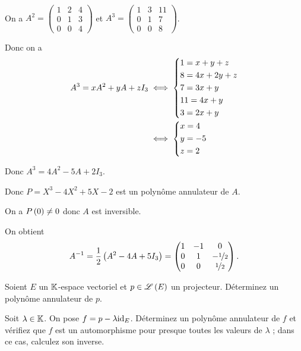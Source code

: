\begin{corr}~\\
On a \(A^2=\begin{pmatrix}
1 & 2 & 4 \\
0 & 1 & 3 \\
0 & 0 & 4
\end{pmatrix}\) et \(A^3=\begin{pmatrix}
1 & 3 & 11 \\
0 & 1 & 7 \\
0 & 0 & 8
\end{pmatrix}\).

Donc on a \[\begin{aligned}
A^3=xA^2+yA+zI_3&\iff\begin{dcases}
1=x+y+z \\
8=4x+2y+z \\
7=3x+y \\
11=4x+y \\
3=2x+y
\end{dcases} \\
&\iff\begin{dcases}
x=4 \\
y=-5 \\
z=2
\end{dcases}
\end{aligned}\]

Donc \(A^3=4A^2-5A+2I_3\).

Donc \(P=X^3-4X^2+5X-2\) est un polynôme annulateur de \(A\).

On a \(P\left(0\right)\not=0\) donc \(A\) est inversible.

On obtient \[A^{-1}=\dfrac{1}{2}\left(A^2-4A+5I_3\right)=\begin{pmatrix}
1 & -1 & 0 \\
0 & 1 & -\nicefrac{1}{2} \\
0 & 0 & \nicefrac{1}{2}
\end{pmatrix}.\]
\end{corr}

\begin{exo}
Soient \(E\) un \(\mathbb{K}\)-espace vectoriel et \(p\in\mathscr{L}\left(E\right)\) un projecteur. Déterminez un polynôme annulateur de \(p\).

Soit \(\lambda\in\mathbb{K}\). On pose \(f=p-\lambda\mathrm{id}_{E}\). Déterminez un polynôme annulateur de \(f\) et vérifiez que \(f\) est un automorphisme pour presque toutes les valeurs de \(\lambda\) ; dans ce cas, calculez son inverse.
\end{exo}

